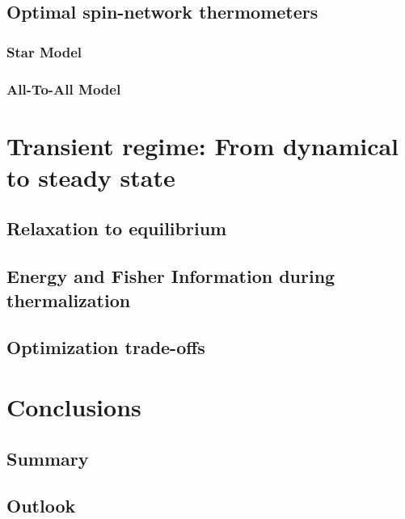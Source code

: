 \documentclass{article}
\begin{document}
\subsection{Optimal spin-network thermometers}
\subsubsection{Star Model}
\subsubsection{All-To-All Model}

\newpage
\section{Transient regime: From dynamical to steady state}
\subsection{Relaxation to equilibrium}
\subsection{Energy and Fisher Information during thermalization}
\subsection{Optimization trade-offs}

\newpage
\section{Conclusions}
\subsection{Summary}
\subsection{Outlook}

\newpage
\appendix
\setcounter{equation}{0}
\renewcommand{\theequation}{A\arabic{equation}}
\end{document}
